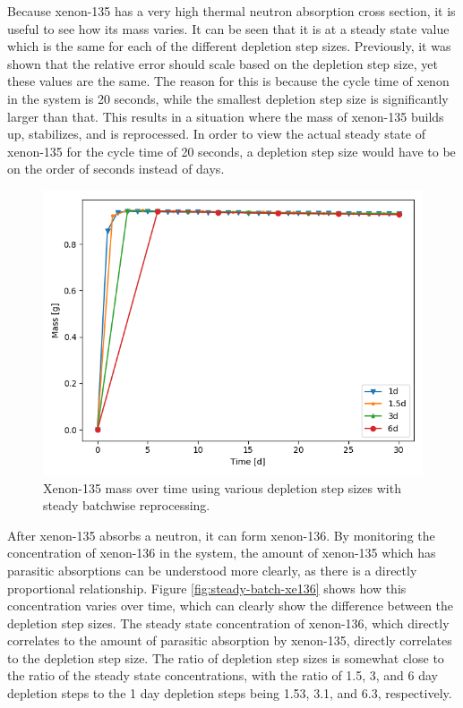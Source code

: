 Because xenon-135 has a very high thermal neutron absorption cross section, it is useful to see how its mass varies. It can be seen that it is at a steady state value which is the same for each of the different depletion step sizes. Previously, it was shown that the relative error should scale based on the depletion step size, yet these values are the same. The reason for this is because the cycle time of xenon in the system is 20 seconds, while the smallest depletion step size is significantly larger than that. This results in a situation where the mass of xenon-135 builds up, stabilizes, and is reprocessed. In order to view the actual steady state of xenon-135 for the cycle time of 20 seconds, a depletion step size would have to be on the order of seconds instead of days.

\begin{figure}[H]
  \centering
  \includegraphics[scale=0.5]{images/Xe135_sp_comp.png}
  \caption{Xenon-135 mass over time using various depletion step sizes with steady batchwise reprocessing.}
   \label{fig:steady-batch-xe135}
\end{figure}

After xenon-135 absorbs a neutron, it can form xenon-136. By monitoring the concentration of xenon-136 in the system, the amount of xenon-135 which has parasitic absorptions can be understood more clearly, as there is a directly proportional relationship. Figure \ref{fig:steady-batch-xe136} shows how this concentration varies over time, which can clearly show the difference between the depletion step sizes. The steady state concentration of xenon-136, which directly correlates to the amount of parasitic absorption by xenon-135, directly correlates to the depletion step size. The ratio of depletion step sizes is somewhat close to the ratio of the steady state concentrations, with the ratio of 1.5, 3, and 6 day depletion steps to the 1 day depletion steps being 1.53, 3.1, and 6.3, respectively.

